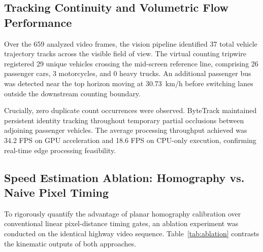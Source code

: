 \documentclass[conference]{IEEEtran}
\begin{document}
\subsection{Tracking Continuity and Volumetric Flow Performance}
Over the 659 analyzed video frames, the vision pipeline identified 37 total vehicle trajectory tracks across the visible field of view. The virtual counting tripwire registered 29 unique vehicles crossing the mid-screen reference line, comprising 26 passenger cars, 3 motorcycles, and 0 heavy trucks. An additional passenger bus was detected near the top horizon moving at 30.73~km/h before switching lanes outside the downstream counting boundary. 

Crucially, zero duplicate count occurrences were observed. ByteTrack maintained persistent identity tracking throughout temporary partial occlusions between adjoining passenger vehicles. The average processing throughput achieved was 34.2 FPS on GPU acceleration and 18.6 FPS on CPU-only execution, confirming real-time edge processing feasibility.

\subsection{Speed Estimation Ablation: Homography vs. Naive Pixel Timing}
To rigorously quantify the advantage of planar homography calibration over conventional linear pixel-distance timing gates, an ablation experiment was conducted on the identical highway video sequence. Table~\ref{tab:ablation} contrasts the kinematic outputs of both approaches.

\begin{table}[htbp]
\caption{Comparative Kinematics: Naive Pixel vs. Homography}
\label{tab:ablation}
\centering
{}
\end{table}
\end{document}
